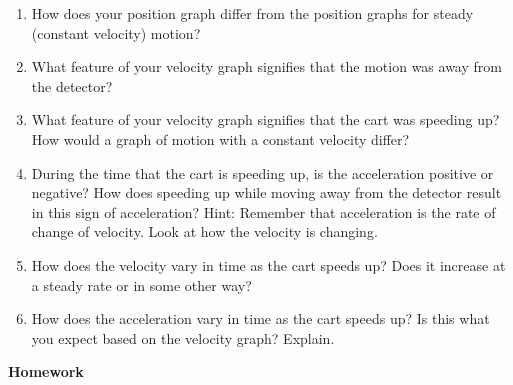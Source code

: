 \begin{enumerate}
\item How does your position graph differ from the position graphs for steady
(constant velocity) motion? 
\vspace{13mm}

\item What feature of your velocity graph signifies that the motion was away from
the detector? 
\vspace{13mm}

\item What feature of your velocity graph signifies that the cart was speeding
up? How would a graph of motion with a constant velocity differ? 
\vspace{13mm}

\item During the time that the cart is speeding up, is the acceleration positive
or negative? How does speeding up while moving away from the detector result
in this sign of acceleration? Hint: Remember that acceleration is the rate of
change of velocity. Look at how the velocity is changing.
\vspace{13mm}

\item How does the velocity vary in time as the cart speeds up? Does it increase
at a steady rate or in some other way? 
\vspace{13mm}

\item How does the acceleration vary in time as the cart speeds up? Is this what
you expect based on the velocity graph? Explain.
\vspace{13mm}

\end{enumerate}

\newpage

\textbf{Homework} 

